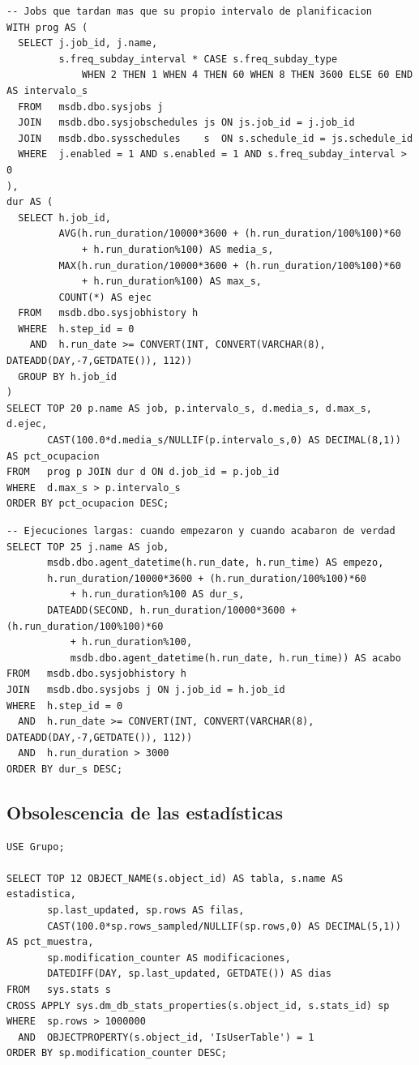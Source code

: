 \documentclass[11pt,a4paper]{article}
\begin{document}
\begin{lstlisting}[style=sql]
-- Jobs que tardan mas que su propio intervalo de planificacion
WITH prog AS (
  SELECT j.job_id, j.name,
         s.freq_subday_interval * CASE s.freq_subday_type
             WHEN 2 THEN 1 WHEN 4 THEN 60 WHEN 8 THEN 3600 ELSE 60 END AS intervalo_s
  FROM   msdb.dbo.sysjobs j
  JOIN   msdb.dbo.sysjobschedules js ON js.job_id = j.job_id
  JOIN   msdb.dbo.sysschedules    s  ON s.schedule_id = js.schedule_id
  WHERE  j.enabled = 1 AND s.enabled = 1 AND s.freq_subday_interval > 0
),
dur AS (
  SELECT h.job_id,
         AVG(h.run_duration/10000*3600 + (h.run_duration/100%100)*60
             + h.run_duration%100) AS media_s,
         MAX(h.run_duration/10000*3600 + (h.run_duration/100%100)*60
             + h.run_duration%100) AS max_s,
         COUNT(*) AS ejec
  FROM   msdb.dbo.sysjobhistory h
  WHERE  h.step_id = 0
    AND  h.run_date >= CONVERT(INT, CONVERT(VARCHAR(8), DATEADD(DAY,-7,GETDATE()), 112))
  GROUP BY h.job_id
)
SELECT TOP 20 p.name AS job, p.intervalo_s, d.media_s, d.max_s, d.ejec,
       CAST(100.0*d.media_s/NULLIF(p.intervalo_s,0) AS DECIMAL(8,1)) AS pct_ocupacion
FROM   prog p JOIN dur d ON d.job_id = p.job_id
WHERE  d.max_s > p.intervalo_s
ORDER BY pct_ocupacion DESC;
\end{lstlisting}

\begin{lstlisting}[style=sql]
-- Ejecuciones largas: cuando empezaron y cuando acabaron de verdad
SELECT TOP 25 j.name AS job,
       msdb.dbo.agent_datetime(h.run_date, h.run_time) AS empezo,
       h.run_duration/10000*3600 + (h.run_duration/100%100)*60
           + h.run_duration%100 AS dur_s,
       DATEADD(SECOND, h.run_duration/10000*3600 + (h.run_duration/100%100)*60
           + h.run_duration%100,
           msdb.dbo.agent_datetime(h.run_date, h.run_time)) AS acabo
FROM   msdb.dbo.sysjobhistory h
JOIN   msdb.dbo.sysjobs j ON j.job_id = h.job_id
WHERE  h.step_id = 0
  AND  h.run_date >= CONVERT(INT, CONVERT(VARCHAR(8), DATEADD(DAY,-7,GETDATE()), 112))
  AND  h.run_duration > 3000
ORDER BY dur_s DESC;
\end{lstlisting}

\subsection{Obsolescencia de las estadísticas}

\begin{lstlisting}[style=sql]
USE Grupo;

SELECT TOP 12 OBJECT_NAME(s.object_id) AS tabla, s.name AS estadistica,
       sp.last_updated, sp.rows AS filas,
       CAST(100.0*sp.rows_sampled/NULLIF(sp.rows,0) AS DECIMAL(5,1)) AS pct_muestra,
       sp.modification_counter AS modificaciones,
       DATEDIFF(DAY, sp.last_updated, GETDATE()) AS dias
FROM   sys.stats s
CROSS APPLY sys.dm_db_stats_properties(s.object_id, s.stats_id) sp
WHERE  sp.rows > 1000000
  AND  OBJECTPROPERTY(s.object_id, 'IsUserTable') = 1
ORDER BY sp.modification_counter DESC;
\end{lstlisting}
\end{document}
